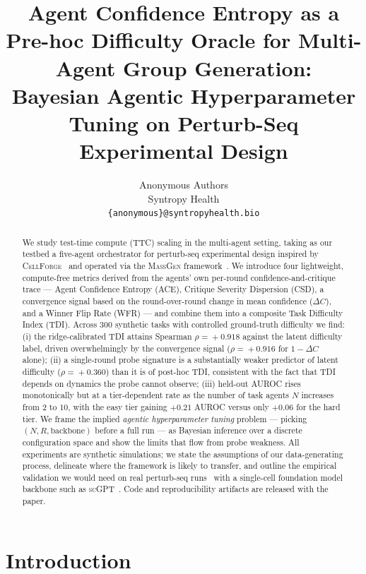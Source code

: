 \documentclass[10pt,a4paper]{article}
\title{Agent Confidence Entropy as a Pre-hoc Difficulty Oracle for
       Multi-Agent Group Generation:\\
       Bayesian Agentic Hyperparameter Tuning on Perturb-Seq
       Experimental Design}
\author{%
  Anonymous Authors\\
  Syntropy Health\\
  \texttt{\{anonymous\}@syntropyhealth.bio}%
}
\date{}
\begin{document}
\maketitle

\begin{abstract}
We study test-time compute (TTC) scaling in the multi-agent setting, taking as
our testbed a five-agent orchestrator for perturb-seq experimental design
inspired by \textsc{CellForge}~\citep{chen2025cellforge} and operated via the
\textsc{MassGen} framework~\citep{massgen2025github}. We introduce four
lightweight, compute-free metrics derived from the agents' own per-round
confidence-and-critique trace --- Agent Confidence Entropy (ACE), Critique
Severity Dispersion (CSD), a convergence signal based on the round-over-round
change in mean confidence ($\Delta C$), and a Winner Flip Rate (WFR) --- and
combine them into a composite Task Difficulty Index (TDI).
Across $300$ synthetic tasks with controlled ground-truth difficulty we find:
(i) the ridge-calibrated TDI attains Spearman $\rho\!=\!{+}0.918$ against the
latent difficulty label, driven overwhelmingly by the convergence signal
($\rho\!=\!{+}0.916$ for $1-\Delta C$ alone);
(ii) a single-round probe signature is a substantially weaker predictor of
latent difficulty ($\rho\!=\!{+}0.360$) than it is of post-hoc TDI, consistent
with the fact that TDI depends on dynamics the probe cannot observe;
(iii) held-out AUROC rises monotonically but at a tier-dependent rate as the
number of task agents $N$ increases from $2$ to $10$, with the easy tier
gaining $+0.21$ AUROC versus only $+0.06$ for the hard tier.
We frame the implied \emph{agentic hyperparameter tuning} problem --- picking
$(N, R, \textrm{backbone})$ before a full run --- as Bayesian inference over a
discrete configuration space and show the limits that flow from probe weakness.
All experiments are synthetic simulations; we state the assumptions of our
data-generating process, delineate where the framework is likely to transfer,
and outline the empirical validation we would need on real perturb-seq
runs~\citep{norman2019perturbseq,replogle2022perturbseq} with a
single-cell foundation model backbone such as \textsc{scGPT}~\citep{cui2024scgpt}.
Code and reproducibility artifacts are released with the paper.
\end{abstract}

\section{Introduction}\label{sec:intro}
\end{document}
